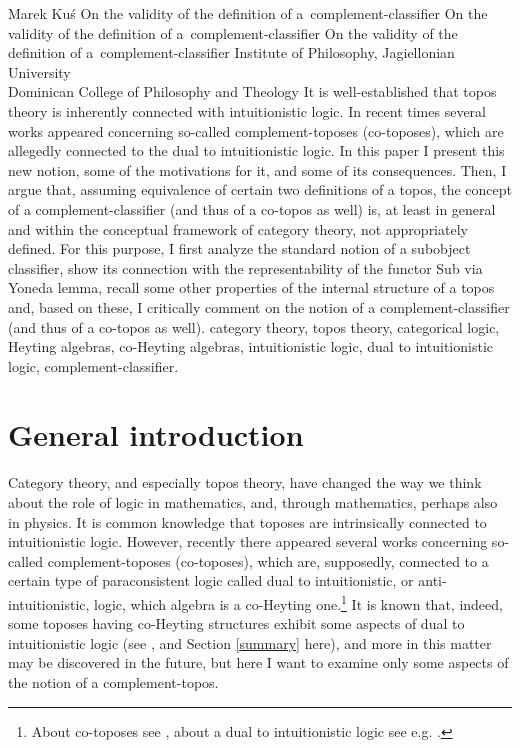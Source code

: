 

\begin{artengenv}{Marek Ku\'s}
	{On the validity of the definition of a~complement-classifier}
	{On the validity of the definition of a~complement-classifier}
	{On the validity of the definition of a~complement-classifier}
	{Institute of Philosophy, Jagiellonian University\\Dominican College of Philosophy and Theology}
	{It is well-established that topos theory is inherently connected with intuitionistic logic. In recent times several works appeared concerning so-called com\-ple\-ment-toposes (co-toposes), which are allegedly connected to the dual to intuitionistic logic. In this paper I present this new notion, some of the motivations for it, and some of its consequences. Then, I argue that, assuming equivalence of certain two definitions of a topos, the concept of a complement-classifier (and thus of a co-topos as well) is, at least in general and within the conceptual framework of category theory, not appropriately defined. For this purpose, I first analyze the standard notion of a subobject classifier, show its connection with the representability of the functor \textsf{Sub} via Yoneda lemma, recall some other properties of the internal structure of a topos and, based on these, I critically comment on the notion of a complement-classifier (and thus of a co-topos as well).}
	{category theory, topos theory, categorical logic, Heyting algebras, co-Heyting algebras, in\-tu\-itionistic logic, dual to in\-tu\-itionistic logic, complement-clas\-si\-fier.}


\section{General introduction} \label{intro}


\lettrine[loversize=0.13,lines=2,lraise=-0.03,nindent=0em,findent=0.2pt]%
{C}{}ategory theory, and especially topos theory, have changed the way we think about the role of logic in mathematics, and, through mathematics, perhaps also in physics. It is common knowledge that toposes are intrinsically connected to intuitionistic logic. However, recently there appeared several works concerning so-called com\-ple\-ment-toposes (co-toposes), which are, supposedly, connected to a certain type of paraconsistent logic called dual to intuitionistic, or anti-intuitionistic, logic, which algebra is a co-Heyting one.\footnote{About co-toposes see \parencite{mortensen-1995,mortensen-2003,james-phd-1996,estrada-gonzalez-2010,estrada-gonzalez-2015}, about a dual to intuitionistic logic see e.g. \parencite{goodman-1981, czermak-1977, urbas-1996, kamide-2003}.} It is known that, indeed, some toposes having co-Heyting structures exhibit some aspects of dual to intuitionistic logic (see \parencite{reyes-zolfaghari-1996}, and Section \ref{summary} here), and more in this matter may be discovered in the future, but here I want to examine only some aspects of the notion of a com\-ple\-ment-topos.


\end{artengenv}
